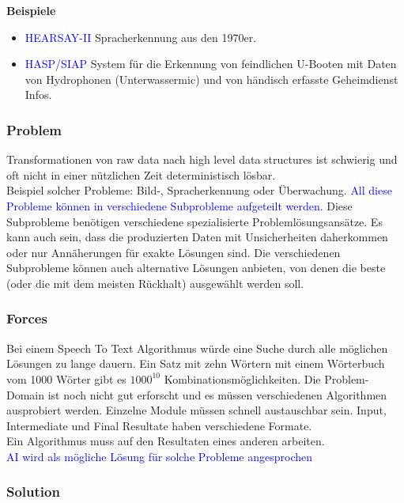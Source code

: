 \textbf{Beispiele}

\begin{itemize}
    \item \textcolor{blue}{HEARSAY-II} Spracherkennung aus den 1970er.
    \item \textcolor{blue}{HASP/SIAP} System für die Erkennung von feindlichen U-Booten mit Daten von Hydrophonen (Unterwassermic) und von händisch erfasste Geheimdienst Infos.
\end{itemize}

\subsubsection{Problem}

Transformationen von raw data nach high level data structures ist schwierig und oft nicht in einer nützlichen Zeit deterministisch lösbar. \\

Beispiel solcher Probleme: Bild-, Spracherkennung oder Überwachung. \textcolor{blue}{All diese Probleme können in verschiedene Subprobleme aufgeteilt werden.} Diese Subprobleme benötigen verschiedene spezialisierte Problemlösungsansätze. Es kann auch sein, dass die produzierten Daten mit Unsicherheiten daherkommen oder nur Annäherungen für exakte Lösungen sind. Die verschiedenen Subprobleme können auch alternative Lösungen anbieten, von denen die beste (oder die mit dem meisten Rückhalt) ausgewählt werden soll.

\subsubsection{Forces}

Bei einem Speech To Text Algorithmus würde eine Suche durch alle möglichen Lösungen zu lange dauern. Ein Satz mit zehn Wörtern mit einem Wörterbuch vom 1000 Wörter gibt es $1000^{10}$ Kombinationsmöglichkeiten.
Die Problem-Domain ist noch nicht gut erforscht und es müssen verschiedenen Algorithmen ausprobiert werden. Einzelne Module müssen schnell austauschbar sein.
Input, Intermediate und Final Resultate haben verschiedene Formate. \\

Ein Algorithmus muss auf den Resultaten eines anderen arbeiten. \\

\textcolor{blue}{AI wird als mögliche Lösung für solche Probleme angesprochen}

\subsubsection{Solution}

